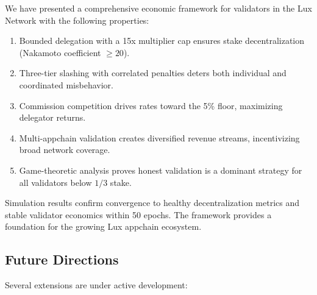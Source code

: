 \documentclass[11pt,a4paper]{article}
\begin{document}
We have presented a comprehensive economic framework for validators in the Lux Network with the following properties:

\begin{enumerate}
    \item Bounded delegation with a 15x multiplier cap ensures stake decentralization (Nakamoto coefficient $\geq 20$).
    \item Three-tier slashing with correlated penalties deters both individual and coordinated misbehavior.
    \item Commission competition drives rates toward the 5\% floor, maximizing delegator returns.
    \item Multi-appchain validation creates diversified revenue streams, incentivizing broad network coverage.
    \item Game-theoretic analysis proves honest validation is a dominant strategy for all validators below $1/3$ stake.
\end{enumerate}

Simulation results confirm convergence to healthy decentralization metrics and stable validator economics within 50 epochs. The framework provides a foundation for the growing Lux appchain ecosystem.

\subsection{Future Directions}

Several extensions are under active development:
\end{document}

